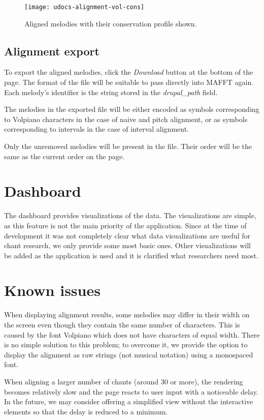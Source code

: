 \begin{figure}[!h]
\centering
\texttt{[image: udocs-alignment-vol-cons]}
\caption{Aligned melodies with their conservation profile shown.}
\label{fig:align-cons}
\end{figure}

\subsection{Alignment export}

To export the aligned melodies, click the \emph{Download} button at the bottom of the page. The format of the file will be suitable to pass directly into MAFFT again. Each melody's
identifier is the string stored in the \emph{drupal\_path} field.

The melodies in the exported file will be either encoded as symbols corresponding to Volpiano characters in the case of naive and pitch alignment, or as symbols corresponding to intervals
in the case of interval alignment.

Only the unremoved melodies will be present in the file. Their order will be the same as the current order on the page.

\section{Dashboard}

The dashboard provides visualizations of the data. The visualizations are simple, as this feature is not the main priority of the application. Since at the time of development
it was not completely clear what data visualizations are useful for chant research, we only provide some most basic ones. Other visualizations will be added
as the application is used and it is clarified what researchers need most.


\section{Known issues}

When displaying alignment results, some melodies may differ in their width on the screen even though they contain the same number of characters. This is caused by the font
Volpiano which does not have characters of equal width. There is no simple solution to this problem; to overcome it, we provide the option to display the alignment
as raw strings (not musical notation) using a monospaced font.

When aligning a larger number of chants (around 30 or more), the rendering becomes relatively slow and the page reacts to user input with a noticeable delay.
In the future, we may consider offering a simplified view without the interactive elements so that the delay is reduced to a minimum.
